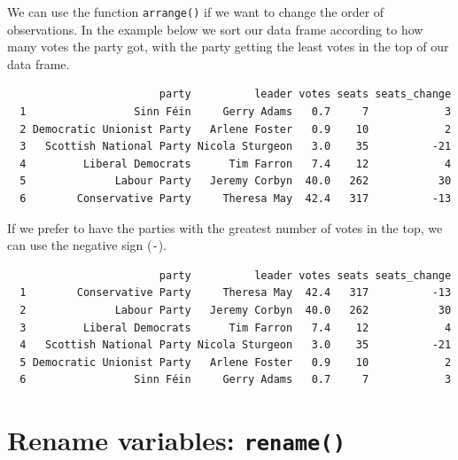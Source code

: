 \documentclass[12pt,oneside]{reedthesis}
\theoremstyle{definition}
\theoremstyle{definition}
\theoremstyle{definition}
\theoremstyle{remark}
\begin{document}
  We can use the function \texttt{arrange()} if we want to change the
  order of observations. In the example below we sort our data frame
  according to how many votes the party got, with the party getting the
  least votes in the top of our data frame.
  \begin{Shaded}
  \begin{Highlighting}[]
  \end{Highlighting}
  \end{Shaded}
  \begin{verbatim}
                        party          leader votes seats seats_change
  1                 Sinn Féin     Gerry Adams   0.7     7            3
  2 Democratic Unionist Party   Arlene Foster   0.9    10            2
  3   Scottish National Party Nicola Sturgeon   3.0    35          -21
  4         Liberal Democrats      Tim Farron   7.4    12            4
  5              Labour Party   Jeremy Corbyn  40.0   262           30
  6        Conservative Party     Theresa May  42.4   317          -13
  \end{verbatim}
  If we prefer to have the parties with the greatest number of votes in
  the top, we can use the negative sign (\texttt{-}).
  \begin{Shaded}
  \begin{Highlighting}[]
  \OperatorTok{-}
  \end{Highlighting}
  \end{Shaded}
  \begin{verbatim}
                        party          leader votes seats seats_change
  1        Conservative Party     Theresa May  42.4   317          -13
  2              Labour Party   Jeremy Corbyn  40.0   262           30
  3         Liberal Democrats      Tim Farron   7.4    12            4
  4   Scottish National Party Nicola Sturgeon   3.0    35          -21
  5 Democratic Unionist Party   Arlene Foster   0.9    10            2
  6                 Sinn Féin     Gerry Adams   0.7     7            3
  \end{verbatim}
  \section{\texorpdfstring{Rename variables:
  \texttt{rename()}}{Rename variables: rename()}}\label{rename-variables-rename}
  
\end{document}
